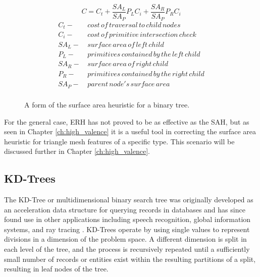 \begin{figure}[H]
  \begin{equation}
    C =  C_{t} + \frac{SA_{L}}{SA_{P}}P_{L}C_{i} +  \frac{SA_{R}}{SA_{P}}P_{R}C_{i}
    \label{eq:SAH}
  \end{equation}
  \begin{align*}
    C_{t} - & \,cost\, of\, traversal\, to\, child\, nodes \\
    C_{i} - & \, cost\, of\, primitive\, intersection\, check\, \\
    SA_{L} - &  \,surface\, area\, of\, left\, child \\
    P_{L} - & \, primitives\, contained\, by\, the\, left\, child  \\
    SA_{R} - & \, surface\, area\, of\, right\, child \\
    P_{R} - & \, primitives\, contained\, by\, the\, right\, child \\
    SA_{P} - & \, parent\, node's \, surface \, area \\
  \end{align*}
  \caption{A form of the surface area heuristic for a binary tree.}
  \label{fig:SAH}
\end{figure}

For the general case, ERH has not proved to be as effective as the SAH, but as
seen in Chapter \ref{ch:high_valence} it is a useful tool in correcting the
surface area heuristic for triangle mesh features of a specific type. This
scenario will be discussed further in Chapter \ref{ch:high_valence}.

\subsection{KD-Trees}
\label{subsec:kd-trees}
The KD-Tree or multidimensional binary search tree was originally developed as
an acceleration data structure for querying records in databases and has since
found use in other applications including speech recognition, global information
systems, and ray tracing \cite{Bentley_1975}. KD-Trees operate by using single
values to represent divisions in a dimension of the problem space. A different
dimension is split in each level of the tree, and the process is recursively
repeated until a sufficiently small number of records or entities exist within
the resulting partitions of a split, resulting in leaf nodes of the tree.

